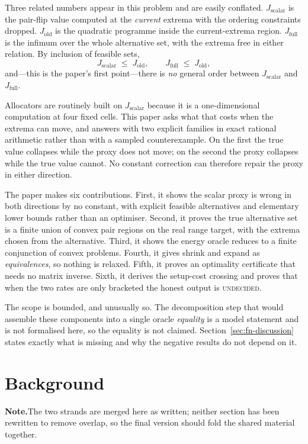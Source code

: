\documentclass[conference]{IEEEtran}
\theoremstyle{definition}
\newif\ifshownotes\shownotestrue
\newcommand{\NOTEPAR}[1]{\ifshownotes\par\vspace{2pt}\noindent%
  {\color{notecol}\textsf{\footnotesize\textbf{Note.}\;#1}}\par\vspace{2pt}\fi}
\begin{document}
Three related numbers appear in this problem and are easily conflated.
$J_{\mathrm{scalar}}$ is the pair-flip value computed at the \emph{current} extrema with the
ordering constraints dropped. $J_{\mathrm{old}}$ is the quadratic programme inside the
current-extrema region. $J_{\mathrm{full}}$ is the infimum over the whole alternative set,
with the extrema free in either relation. By inclusion of feasible sets,
\begin{equation}
J_{\mathrm{scalar}}\;\leq\;J_{\mathrm{old}},
\qquad
J_{\mathrm{full}}\;\leq\;J_{\mathrm{old}},
\label{eq:fn-order}
\end{equation}
and---this is the paper's first point---there is \emph{no} general order between
$J_{\mathrm{scalar}}$ and $J_{\mathrm{full}}$.

Allocators are routinely built on $J_{\mathrm{scalar}}$ because it is a one-dimensional
computation at four fixed cells. This paper asks what that costs when the extrema can move,
and answers with two explicit families in exact rational arithmetic rather than with a
sampled counterexample. On the first the true value collapses while the proxy does not move;
on the second the proxy collapses while the true value cannot. No constant correction can
therefore repair the proxy in either direction.

The paper makes six contributions. First, it shows the scalar proxy is wrong in both
directions by no constant, with explicit feasible alternatives and elementary lower bounds
rather than an optimiser. Second, it proves the true alternative set is a finite union of
convex pair regions on the real range target, with the extrema chosen from the alternative.
Third, it shows the energy oracle reduces to a finite conjunction of convex problems. Fourth,
it gives shrink and expand as \emph{equivalences}, so nothing is relaxed. Fifth, it proves an
optimality certificate that needs no matrix inverse. Sixth, it derives the setup-cost
crossing and proves that when the two rates are only bracketed the honest output is
\textsc{undecided}.

The scope is bounded, and unusually so. The decomposition step that would assemble these
components into a single oracle \emph{equality} is a model statement and is not formalised
here, so the equality is not claimed. Section~\ref{sec:fn-discussion} states exactly what is
missing and why the negative results do not depend on it.


\section{Background}
\NOTEPAR{The two strands are merged here as written; neither section has been rewritten to remove overlap, so the final version should fold the shared material together.}
\end{document}
